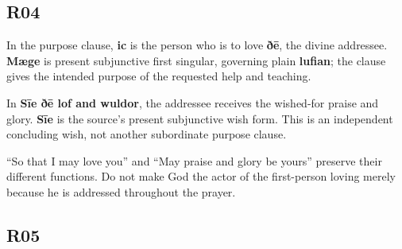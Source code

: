 \subsection*{R04}

\par\begin{minipage}{\linewidth}\raggedright
In the purpose clause, \textbf{ic} is the person who is to love \textbf{ðē}, the divine addressee. \textbf{Mæge} is present subjunctive first singular, governing plain \textbf{lufian}; the clause gives the intended purpose of the requested help and teaching.

In \textbf{Sīe ðē lof and wuldor}, the addressee receives the wished-for praise and glory. \textbf{Sīe} is the source’s present subjunctive wish form. This is an independent concluding wish, not another subordinate purpose clause.

“So that I may love you” and “May praise and glory be yours” preserve their different functions. Do not make God the actor of the first-person loving merely because he is addressed throughout the prayer.

\end{minipage}\par\addvspace{4pt}

\subsection*{R05}

